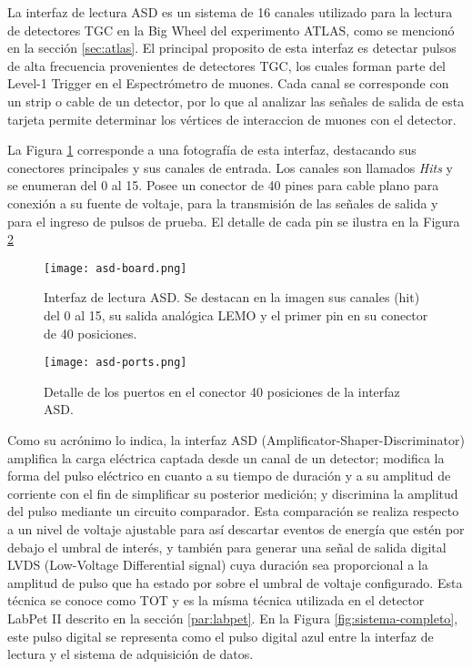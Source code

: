 La interfaz de lectura ASD\cite{1999ATLASICs} es un sistema de 16 canales utilizado para la lectura de detectores TGC en la Big Wheel del experimento ATLAS, como se mencionó en la sección \ref{sec:atlas}. El principal proposito de esta interfaz es detectar pulsos de alta frecuencia provenientes de detectores TGC, los cuales forman parte del Level-1 Trigger en el Espectrómetro de muones. Cada canal se corresponde con un strip o cable de un detector, por lo que al analizar las señales de salida de esta tarjeta permite determinar los vértices de interaccion de muones con el detector.

La Figura \ref{img:asd-board} corresponde a una fotografía de esta interfaz, destacando sus conectores principales y sus canales de entrada. Los canales son llamados \textit{Hits} y se enumeran del 0 al 15. Posee un conector de 40 pines para cable plano para conexión a su fuente de voltaje, para la transmisión de las señales de salida y para el ingreso de pulsos de prueba. El detalle de cada pin se ilustra en la Figura \ref{img:asd-ports}

\begin{figure}[h]
	\centering
	\texttt{[image: asd-board.png]}
	\caption{Interfaz de lectura ASD. Se destacan en la imagen sus canales (hit) del 0 al 15, su salida analógica LEMO y el primer pin en su conector de 40 posiciones.}
	\label{img:asd-board}
\end{figure}

\begin{figure}[h]
	\centering
	\texttt{[image: asd-ports.png]}
	\caption{Detalle de los puertos en el conector 40 posiciones de la interfaz ASD.}
	\label{img:asd-ports}
\end{figure}

Como su acrónimo lo indica, la interfaz ASD (Amplificator-Shaper-Discriminator)  amplifica la carga eléctrica captada desde un canal de un detector; modifica la forma del pulso eléctrico en cuanto a su tiempo de duración y a su amplitud de corriente con el fin de simplificar su posterior medición; y discrimina la amplitud del pulso mediante un circuito comparador. Esta comparación se realiza respecto a un nivel de voltaje ajustable para así descartar eventos de energía que estén por debajo el umbral de interés, y también para generar una señal de salida digital LVDS (Low-Voltage Differential signal) cuya duración sea proporcional a la amplitud de pulso que ha estado por sobre el umbral de voltaje configurado. Esta técnica se conoce como TOT y es la mísma técnica utilizada en el detector LabPet II descrito en la sección \ref{par:labpet}.  En la Figura \ref{fig:sistema-completo}, este pulso digital se representa como el pulso digital azul entre la interfaz de lectura y el sistema de adquisición de datos.
        
